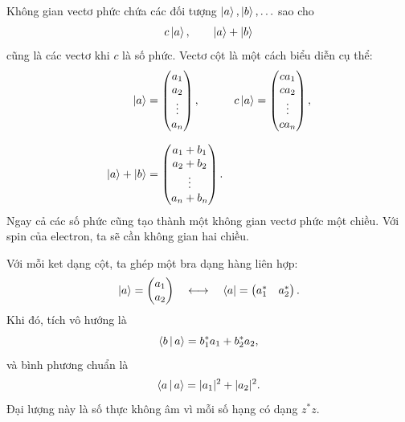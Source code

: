 Không gian vectơ phức chứa các đối tượng \(\left\lvert a\right\rangle,\left\lvert b\right\rangle,\ldots\) sao cho
\begin{equation}
  c\left\lvert a\right\rangle,
  \qquad
  \left\lvert a\right\rangle+\left\lvert b\right\rangle
\end{equation}
cũng là các vectơ khi \(c\) là số phức. Vectơ cột là một cách biểu diễn cụ thể:
\begin{equation}
  \begin{aligned}
    \left\lvert a\right\rangle&=
    \begin{pmatrix}
      a_1\\a_2\\ \vdots\\a_n
    \end{pmatrix},
    &
    c\left\lvert a\right\rangle&=
    \begin{pmatrix}
      ca_1\\ca_2\\ \vdots\\ca_n
    \end{pmatrix},\\[0.7em]
    \left\lvert a\right\rangle+\left\lvert b\right\rangle&=
    \begin{pmatrix}
      a_1+b_1\\a_2+b_2\\ \vdots\\a_n+b_n
    \end{pmatrix}.
  \end{aligned}
  \label{eq:l02-vector-operations}
\end{equation}
Ngay cả các số phức cũng tạo thành một không gian vectơ phức một chiều. Với spin của electron, ta sẽ cần không gian hai chiều.

Với mỗi ket dạng cột, ta ghép một bra dạng hàng liên hợp:
\begin{equation}
  \left\lvert a\right\rangle=
  \begin{pmatrix}a_1\\a_2\end{pmatrix}
  \quad\longleftrightarrow\quad
  \left\langle a\right\rvert=
  \begin{pmatrix}a_1^*&a_2^*\end{pmatrix}.
  \label{eq:l02-bra-ket-components}
\end{equation}
Khi đó, tích vô hướng là
\begin{equation}
  \left\langle b\,\middle|\,a\right\rangle=b_1^*a_1+b_2^*a_2,
  \label{eq:l02-inner-product}
\end{equation}
và bình phương chuẩn là
\begin{equation}
  \left\langle a\,\middle|\,a\right\rangle=|a_1|^2+|a_2|^2.
  \label{eq:l02-norm}
\end{equation}
Đại lượng này là số thực không âm vì mỗi số hạng có dạng \(z^*z\).

